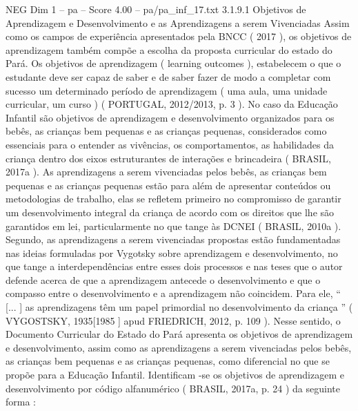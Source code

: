 \begin{textsample}{NEG Dim 1 – pa – Score 4.00 – pa/pa\_inf\_17.txt}  \label{ex:f1_neg_252}
3.1.9.1 Objetivos de Aprendizagem e Desenvolvimento e as Aprendizagens a serem Vivenciadas Assim como os campos de experiência apresentados pela BNCC ( 2017 ), os objetivos de aprendizagem também compõe a escolha da proposta curricular do estado do Pará.
Os objetivos de aprendizagem ( learning outcomes ), estabelecem o que o estudante deve ser capaz de saber e de saber fazer de modo a completar com sucesso um determinado período de aprendizagem ( uma aula, uma unidade curricular, um curso ) ( PORTUGAL, 2012/2013, p. 3 ).
No caso da Educação Infantil são objetivos de aprendizagem e desenvolvimento organizados para os bebês, as crianças bem pequenas e as crianças pequenas, considerados como essenciais para o entender as vivências, os comportamentos, as habilidades da criança dentro dos eixos estruturantes de interações e brincadeira ( BRASIL, 2017a ).
As aprendizagens a serem vivenciadas pelos bebês, as crianças bem pequenas e as crianças pequenas estão para além de apresentar conteúdos ou metodologias de trabalho, elas se refletem primeiro no compromisso de garantir um desenvolvimento integral da criança de acordo com os direitos que lhe são garantidos em lei, particularmente no que tange às DCNEI ( BRASIL, 2010a ).
Segundo, as aprendizagens a serem vivenciadas propostas estão fundamentadas nas ideias formuladas por Vygotsky sobre aprendizagem e desenvolvimento, no que tange a interdependências entre esses dois processos e nas teses que o autor defende acerca de que a aprendizagem antecede o desenvolvimento e que o compasso entre o desenvolvimento e a aprendizagem não coincidem.
Para ele, “ [... ] as aprendizagens têm um papel primordial no desenvolvimento da criança ” ( VYGOSTSKY, 1935[1985 ] apud FRIEDRICH, 2012, p. 109 ).
Nesse sentido, o Documento Curricular do Estado do Pará apresenta os objetivos de aprendizagem e desenvolvimento, assim como as aprendizagens a serem vivenciadas pelos bebês, as crianças bem pequenas e as crianças pequenas, como diferencial no que se propõe para a Educação Infantil.
Identificam -se os objetivos de aprendizagem e desenvolvimento por código alfanumérico ( BRASIL, 2017a, p. 24 ) da seguinte forma :

\end{textsample}
